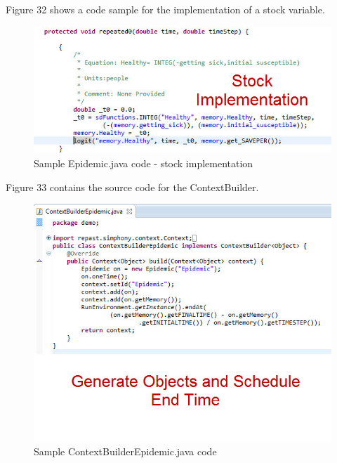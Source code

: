 \documentclass[11pt]{amsart}
\begin{document}
Figure 32 shows a code sample for the implementation of a stock variable.

\begin{figure}[ht]
\begin{center}
\vspace{.2in}
\centerline {
\includegraphics[totalheight=0.3\textheight]{images/030.jpg}
}
\caption{Sample Epidemic.java code - stock implementation}
\label{fig:030}
\end{center}
\end{figure}

Figure 33 contains the source code for the ContextBuilder.

\begin{figure}[ht]
\begin{center}
\vspace{.2in}
\centerline {
\includegraphics[totalheight=0.3\textheight]{images/031.jpg}
}
\caption{Sample ContextBuilderEpidemic.java code}
\label{fig:031}
\end{center}
\end{figure}
\end{document}
